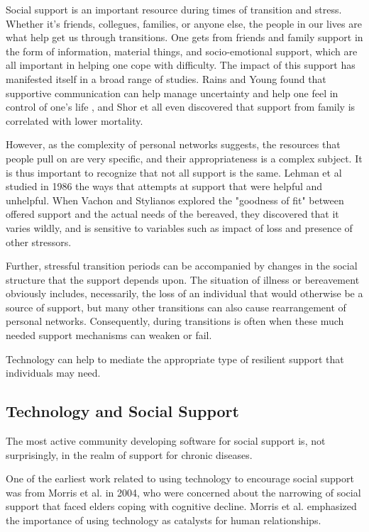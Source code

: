   Social support is an important resource during times of transition and stress.
  Whether it's friends, collegues, families, or anyone else, the people in our lives
  are what help get us through transitions.
  \cite{mikal_13}
  One gets from friends and family support in the form of
  information, material things, and socio-emotional support,
  which are all important in helping one cope with difficulty.
  The impact of this support has manifested itself in a broad range of studies.
  Rains and Young found that supportive communication can help manage uncertainty and
  help one feel in control of one's life \cite{rains_09},
  and Shor et all even discovered that support from
  family is correlated with lower mortality. \cite{shor_13}

  However, as the complexity of personal networks suggests, the resources that people pull on
  are very specific,
  and their appropriateness is a complex subject.
  It is thus important to recognize that not all support is the same.
  Lehman et al studied in 1986 the ways that attempts at support that were helpful and unhelpful.
  \cite{lehman_86}
  When Vachon and Stylianos explored the "goodness of fit" between offered support and the actual needs of
  the bereaved, they discovered that it varies wildly, and is sensitive to variables such as impact of loss
  and presence of other stressors.
  \cite{vachon_88}
  
  Further, stressful transition periods can be accompanied by changes in the social structure
  that the support depends upon.
  The situation of illness or bereavement obviously includes, necessarily,
  the loss of an individual that would otherwise be a source of support,
  but many other transitions can also cause rearrangement of personal networks.
  Consequently, during transitions is often when these much needed
  support mechanisms can weaken or fail.
  \cite{mikal_13}

  Technology can help to mediate the appropriate type of resilient support
  that individuals may need.

  \subsection{Technology and Social Support}
    The most active community developing software for social support is,
    not surprisingly, in the realm of support for chronic diseases.

    One of the earliest work related to using technology to encourage social
    support was from Morris et al. in 2004,
    who were concerned about the narrowing of social support that faced
    elders coping with cognitive decline.
    Morris et al. emphasized the importance of using technology
    as catalysts for human relationships.
    \cite{morris04}

